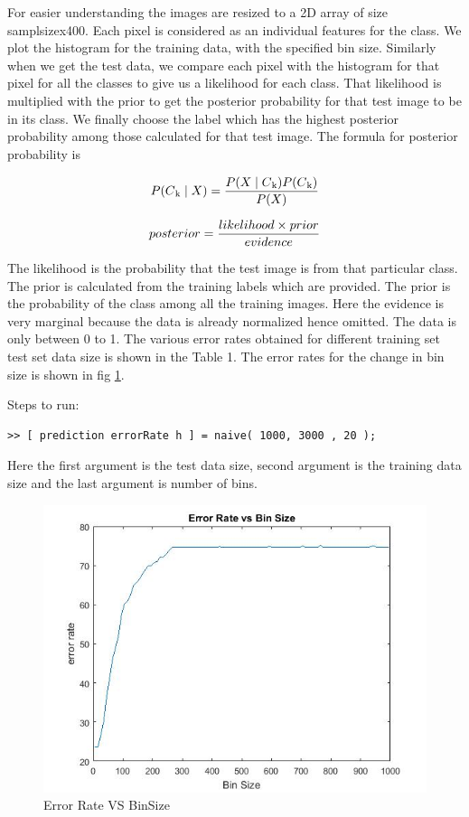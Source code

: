 \documentclass[10pt, letterpaper]{article}
\begin{document}
For easier understanding the images are resized to a 2D array of size samplsizex400. Each pixel is considered as an individual features for the class. We plot the histogram for the training data, with the specified bin size. Similarly when we get the test data, we compare each pixel with the histogram for that pixel for all the classes to give us a likelihood for each class. That likelihood is multiplied with the prior to get the posterior probability for that test image to be in its class. We finally choose the label which has the highest posterior probability among those calculated for that test image. The formula for posterior probability is
 
\begin{displaymath}P(C{\textsubscript k} \mid X) =   \frac{P(X\mid C{\textsubscript k}) P(C{\textsubscript k})}{ P(X)}\end{displaymath}

\begin{displaymath} posterior = \frac{ likelihood \times prior  } {evidence} \\ \end{displaymath}

 \vspace{10mm}
The likelihood is the probability that the test image is from that particular class. The prior is calculated from the training labels which are provided. The prior is the probability of the class among all the training images. Here the evidence is very marginal because the data is already normalized hence omitted. The data is only between 0 to 1.  The various error rates obtained for different training set test set data size is shown in the Table 1. The error rates for the change in bin size is shown in fig \ref{fig:ERvsBin}.


 Steps to run:
\begin{verbatim}
>> [ prediction errorRate h ] = naive( 1000, 3000 , 20 );
\end{verbatim}
Here the first argument is the test data size, second argument is the training data size and the last argument is number of bins.
 \vspace{10mm}

    \begin{figure}
    \includegraphics[width=\linewidth]{images/graph2}
    \caption{ Error Rate VS BinSize}
    \label{fig:ERvsBin}
    \end{figure}
\end{document}
